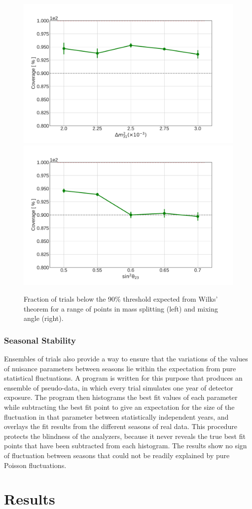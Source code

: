 \begin{figure}
    \centering
    \includegraphics[width=0.45\linewidth]{figures/measurement/three_flavor/coverage_test/coverage_dm_v3.pdf}
    \includegraphics[width=0.45\linewidth]{figures/measurement/three_flavor/coverage_test/coverage_t23_v3.pdf}
    \caption{Fraction of trials below the 90\% threshold expected from Wilks' theorem for a range of points in mass splitting (left) and mixing angle (right).}
    \label{fig:three-flavor-coverage}
\end{figure}

\subsubsection{Seasonal Stability}

Ensembles of trials also provide a way to ensure that the variations of the values of nuisance parameters between seasons lie within the expectation from pure statistical fluctuations. A program is written for this purpose that produces an ensemble of pseudo-data, in which every trial simulates one year of detector exposure. The program then histograms the best fit values of each parameter while subtracting the best fit point to give an expectation for the size of the fluctuation in that parameter between statistically independent years, and overlays the fit results from the different seasons of real data. This procedure protects the blindness of the analyzers, because it never reveals the true best fit points that have been subtracted from each histogram. The results show no sign of fluctuation between seasons that could not be readily explained by pure Poisson fluctuations.


\section{Results}

